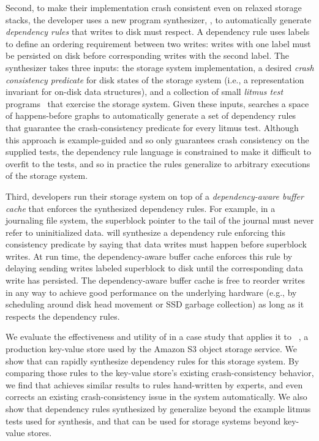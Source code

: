 Second, to make their implementation crash consistent even on relaxed storage stacks,
the developer uses a new program synthesizer, \depsynth,
to automatically generate \emph{dependency rules} that writes to disk must respect.
A dependency rule uses labels to define an ordering requirement between two writes:
writes with one label must be persisted on disk before corresponding writes with the second label.
The \depsynth synthesizer takes three inputs: the storage system implementation,
a desired \emph{crash consistency predicate} for disk states of the storage system
(i.e., a representation invariant for on-disk data structures),
and a collection of small \emph{litmus test} programs~\cite{alglave:litmus-tool,bornholt:ferrite}
that exercise the storage system.
Given these inputs, \depsynth searches a space of happens-before graphs
to automatically generate a set of dependency rules
that guarantee the crash-consistency predicate for every litmus test.
Although this approach is example-guided and so only guarantees crash consistency on the supplied tests,
the dependency rule language is constrained to make it difficult to overfit to the tests,
and so in practice the rules generalize to arbitrary executions of the storage system.

Third, developers run 
their storage system on top of a \emph{dependency-aware buffer cache}
that enforces the synthesized dependency rules.
For example, in a journaling file system,
the superblock pointer to the tail of the journal must never refer to uninitialized data.
\depsynth will synthesize a dependency rule enforcing this consistency predicate
by saying that data writes must happen before superblock writes.
At run time, the dependency-aware buffer cache
enforces this rule by delaying sending writes labeled \textsf{superblock}
to disk until the corresponding \textsf{data} write has persisted.
The dependency-aware buffer cache is free to reorder writes in any way
to achieve good performance on the underlying hardware
(e.g., by scheduling around disk head movement or SSD garbage collection)
as long as it respects the dependency rules.

We evaluate the effectiveness and utility of \depsynth
in a case study that applies it to \shardstore~\cite{bornholt:s3},
a production key-value store used by the Amazon S3 object storage service.
We show that \depsynth can rapidly synthesize dependency rules for this storage system.
By comparing those rules to the key-value store's existing crash-consistency behavior,
we find that \depsynth achieves similar results to rules hand-written by experts,
and even corrects an existing crash-consistency issue in the system automatically.
We also show that dependency rules synthesized by \depsynth
generalize beyond the example litmus tests used for synthesis,
and that \depsynth can be used for storage systems beyond key-value stores.

